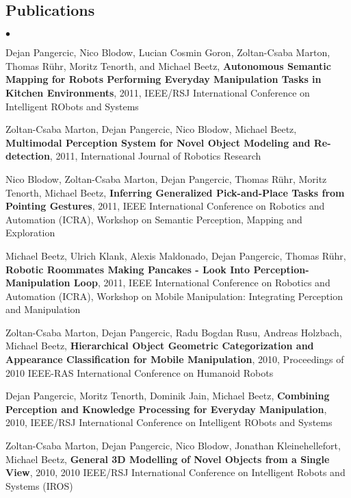 \documentclass[margin,line]{res}
\newenvironment{list2}{
  \begin{list}{$\bullet$}{%
      \setlength{\itemsep}{0in}
      \setlength{\parsep}{0in} \setlength{\parskip}{0in}
      \setlength{\topsep}{0in} \setlength{\partopsep}{0in} 
      \setlength{\leftmargin}{0.2in}}}{\end{list}}
\begin{document}
\begin{resume}
\section{\sc Publications}
\small{
\begin{list2}
\item Dejan Pangercic, Nico Blodow, Lucian Cosmin Goron, Zoltan-Csaba Marton, Thomas R\"uhr, Moritz Tenorth, and Michael Beetz,
\textbf{Autonomous Semantic Mapping for Robots Performing  Everyday Manipulation Tasks in Kitchen Environments}, 
2011, IEEE/RSJ International Conference on Intelligent RObots and Systems \\
\item Zoltan-Csaba Marton, Dejan Pangercic, Nico Blodow, Michael Beetz, \textbf{Multimodal Perception System for Novel Object Modeling and Re-detection}, 2011, International Journal of Robotics Research\\
\item Nico Blodow, Zoltan-Csaba Marton, Dejan Pangercic, Thomas R\"uhr, Moritz Tenorth, Michael Beetz, \textbf{Inferring Generalized Pick-and-Place Tasks from Pointing Gestures}, 2011, IEEE International Conference on Robotics and Automation (ICRA), Workshop on Semantic Perception, Mapping and Exploration\\
\item Michael Beetz, Ulrich Klank, Alexis Maldonado, Dejan Pangercic, Thomas R\"uhr, \textbf{Robotic Roommates Making Pancakes - Look Into Perception-Manipulation Loop}, 2011, IEEE International Conference on Robotics and Automation (ICRA), Workshop on Mobile Manipulation: Integrating Perception and Manipulation\\
\item Zoltan-Csaba Marton, Dejan Pangercic, Radu Bogdan Rusu, Andreas Holzbach, Michael Beetz, \textbf{Hierarchical Object Geometric Categorization and Appearance Classification for Mobile Manipulation}, 2010, Proceedings of 2010 IEEE-RAS International Conference on Humanoid Robots\\
\item Dejan Pangercic, Moritz Tenorth, Dominik Jain, Michael Beetz, \textbf{Combining Perception and Knowledge Processing for Everyday Manipulation}, 2010, IEEE/RSJ International Conference on Intelligent RObots and Systems\\
\item Zoltan-Csaba Marton, Dejan Pangercic, Nico Blodow, Jonathan Kleinehellefort, Michael Beetz,\textbf{ General 3D Modelling of Novel Objects from a Single View}, 2010, 2010 IEEE/RSJ International Conference on Intelligent Robots and Systems (IROS)\\

\end{list2}}
\end{resume}
\end{document}
